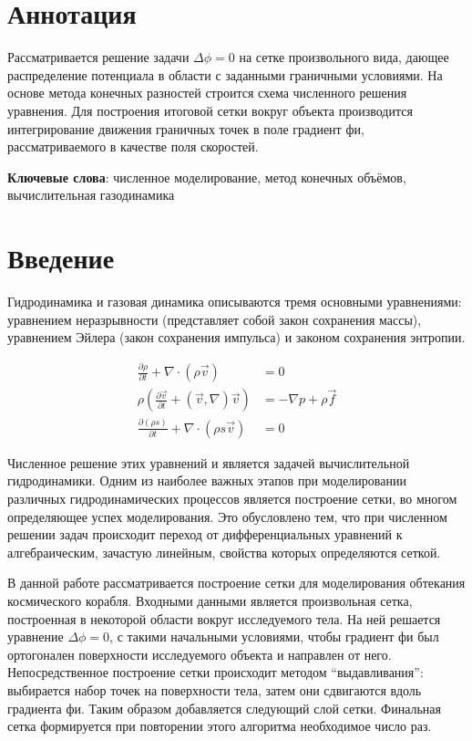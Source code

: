 \documentclass[a4paper,12pt]{article}
\begin{document}


\section*{Аннотация}

Рассматривается решение задачи $\Delta \phi = 0$ на сетке произвольного вида, дающее распределение потенциала в области с заданными граничными условиями. На основе метода конечных разностей строится схема численного решения уравнения. Для построения итоговой сетки вокруг объекта производится интегрирование движения граничных точек в поле градиент фи, рассматриваемого в качестве поля скоростей.

\textbf{Ключевые слова}: численное моделирование, метод конечных объёмов, вычислительная газодинамика

\section{Введение}

Гидродинамика и газовая динамика описываются тремя основными уравнениями: уравнением неразрывности (представляет собой закон сохранения массы), уравнением Эйлера (закон сохранения импульса) и законом сохранения энтропии.

\begin{align}
    \frac{\partial \rho}{\partial t} + \nabla \cdot \left( \rho \vec v \right) &= 0 \\
    \rho \left( \frac{\partial \vec v}{\partial t} + (\vec v, \nabla) \vec v \right) &= - \nabla p + \rho \vec f \\
    \frac{\partial (\rho s)}{\partial t} + \nabla \cdot (\rho s \vec v) &= 0
\end{align}

Численное решение этих уравнений и является задачей вычислительной гидродинамики. Одним из наиболее важных этапов при моделировании различных гидродинамических процессов является построение сетки, во многом определяющее успех моделирования.  Это обусловлено тем, что при численном решении задач происходит переход от дифференциальных уравнений к алгебраическим, зачастую линейным, свойства которых определяются сеткой.

В данной работе рассматривается построение сетки для моделирования обтекания космического корабля. Входными данными является произвольная сетка, построенная в некоторой области вокруг исследуемого тела. На ней решается уравнение $\Delta \phi = 0$, с такими начальными условиями, чтобы градиент фи был ортогонален поверхности исследуемого объекта и направлен от него. Непосредственное построение сетки происходит методом “выдавливания”: выбирается набор точек на поверхности тела, затем они сдвигаются вдоль градиента фи. Таким образом добавляется следующий слой сетки. Финальная сетка формируется при повторении этого алгоритма необходимое число раз.
\end{document}
